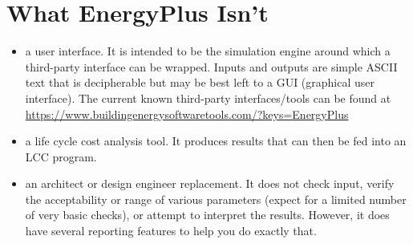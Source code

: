 \section{What EnergyPlus Isn't}\label{what-energyplus-isnt}

\begin{itemize}
\tightlist
\item
    a user interface. It is intended to be the simulation engine around which a third-party interface can be wrapped. Inputs and outputs are simple ASCII text that is decipherable but may be best left to a GUI (graphical user interface). The current known third-party interfaces/tools can be found at \url{https://www.buildingenergysoftwaretools.com/?keys=EnergyPlus}
\end{itemize}

\begin{itemize}
\item
  a life cycle cost analysis tool. It produces results that can then be fed into an LCC program.
\item
  an architect or design engineer replacement. It does not check input, verify the acceptability or range of various parameters (expect for a limited number of very basic checks), or attempt to interpret the results. However, it does have several reporting features to help you do exactly that.
\end{itemize}
